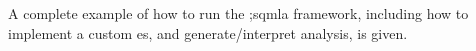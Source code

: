 A complete example of how to run the \g;s{qmla} framework, including how to implement a custom \gls{es}, 
    and generate/interpret analysis, is given. 